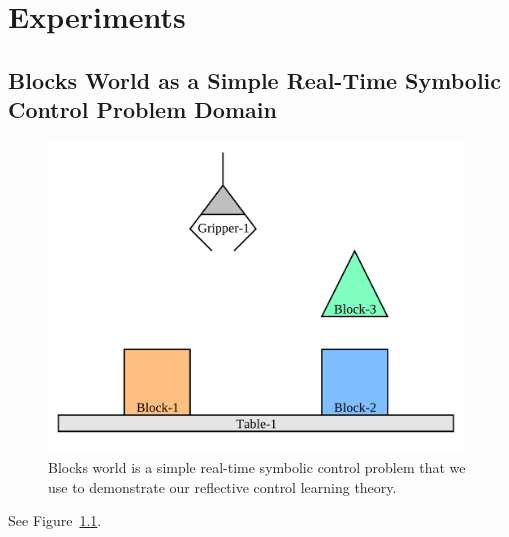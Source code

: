 \chapter{Experiments}\label{ch:experiments}

\section{Blocks World as a Simple Real-Time Symbolic Control Problem Domain}

\begin{figure}[bth]
  \center
  \includegraphics[width=11cm]{gfx/blocks_world_screenshot-1}
  \caption[Blocks world is a simple real-time symbolic control problem.]{Blocks world is a simple real-time symbolic control problem that we use to demonstrate our reflective control learning theory.}
  \label{fig:blocks_world_screenshot-1}
\end{figure}

See Figure~\ref{fig:blocks_world_screenshot-1}.


